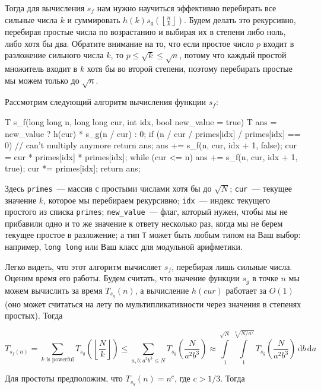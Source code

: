 Тогда для вычисления $s_f$ нам нужно научиться эффективно перебирать все сильные числа $k$ и суммировать $h(k) s_g\left(\left\lfloor \frac{n}{k} \right\rfloor\right)$. Будем делать это рекурсивно, перебирая простые числа по возрастанию и выбирая их в степени либо ноль, либо хотя бы два. Обратите внимание на то, что если простое число $p$ входит в разложение сильного числа $k$, то $p \le \sqrt{k} \le \sqrt{n}$, потому что каждый простой множитель входит в $k$ хотя бы во второй степени, поэтому перебирать простые мы можем только до $\sqrt{n}$.

Рассмотрим следующий алгоритм вычисления функции $s_f$:

\begin{code}
T s_f(long long n, long long cur, int idx, bool new_value = true) {
    T ans = new_value ? h(cur) * s_g(n / cur) : 0;
    if (n / cur / primes[idx] / primes[idx] == 0) { // can't multiply anymore
        return ans;
    }
    ans += s_f(n, cur, idx + 1, false);
    cur = cur * primes[idx] * primes[idx];
    while (cur <= n) {
        ans += s_f(n, cur, idx + 1, true);
        cur *= primes[idx];
    }
    return ans;
}
\end{code}

Здесь \texttt{primes}~--- массив с простыми числами хотя бы до $\sqrt{N}$; \texttt{cur}~--- текущее значение $k$, которое мы перебираем рекурсивно; \texttt{idx}~--- индекс текущего простого из списка \texttt{primes}; \texttt{new\_value}~--- флаг, который нужен, чтобы мы не прибавили одно и то же значение к ответу несколько раз, когда мы не берем текущее простое в разложение; а тип \texttt{T} может быть любым типом на Ваш выбор: например, \texttt{long long} или Ваш класс для модульной арифметики.

Легко видеть, что этот алгоритм вычисляет $s_f$, перебирая лишь сильные числа. Оценим время его работы. Будем считать, что значение функции $s_g$ в точке $n$ мы можем вычислить за время $T_{s_g}(n)$, а вычисление $h(cur)$ работает за $O(1)$ (оно может считаться на лету по мультипликативности через значения в степенях простых). Тогда

$$T_{s_f(n)} = \sum_{k\text{ is powerful}}T_{s_g}\left(\left\lfloor\frac{N}{k}\right\rfloor\right)\leq\sum_{a, b : a^2b^3\leq N}T_{s_g}\left(\frac{N}{a^2b^3}\right)\approx\int\limits_{1}^{\sqrt{N}}\int\limits_{1}^{\sqrt[3]{N/a^2}}T_{s_g}\left(\frac{N}{a^2b^3}\right)\,\mathrm{d}b\,\mathrm{d}a$$

Для простоты предположим, что $T_{s_g}(n) = n^c$, где $c > 1/3$. Тогда


